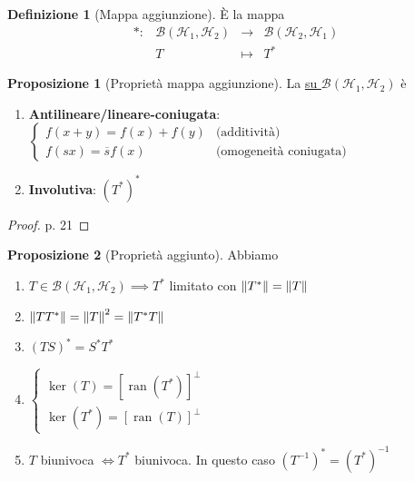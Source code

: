 \documentclass[a4paper,10pt]{article}
\theoremstyle{definition}
\DeclareMathOperator*{\ran}{ran}
\newcommand{\hil}{\mathcal{H}} %
\theoremstyle{indentdefinition}
\newtheorem{defn}{Definizione}[section]
\theoremstyle{indenttheorem}
\newtheorem{prop}{Proposizione}
\theoremstyle{myremark}
\theoremstyle{indentgeneral}
\newenvironment{myboxed} 
{\noindent\begin{lrbox}{\mybox}\begin{minipage}{\textwidth}}
{\end{minipage}\end{lrbox}\fbox{\usebox{\mybox}}}
\begin{document}
\begin{defn}[Mappa aggiunzione]\label{defn-mappa-aggiunzione} È la mappa
$$\begin{array}{cccc}
   *: & \mathcal{B}(\mathcal{H}_1,\mathcal{H}_2) & \to  & \mathcal{B}(\mathcal{H}_2,\mathcal{H}_1) \\
    & T &\mapsto & T^* 
\end{array}$$
\end{defn}

\begin{prop}[Proprietà mappa aggiunzione]\label{thm-prop-mappa-aggiunzione} La  \underline{su $\mathcal{B}(\hil_1,\hil_2)$} è
\begin{enumerate}
    \item \textbf{Antilineare/lineare-coniugata}: $\begin{cases}
        f(x+y)=f(x)+f(y) & \text{(additività)} \\
        f(sx)=\overline{s}f(x) & \text{(omogeneità coniugata)}
    \end{cases}$
    \item \textbf{Involutiva}: $(T^*)^*$
\end{enumerate}
\end{prop}
\begin{proof}
    p. 21
\end{proof}

\begin{myboxed}
\begin{prop}[Proprietà aggiunto]\label{thm-prop-aggiunto}
    Abbiamo
    \begin{enumerate}
        \item $T\in\mathcal{B}(\mathcal{H}_1,\mathcal{H}_2)\implies T^*$ limitato con $\norm{T^*}=\norm{T}$
        \item $\norm{TT^*}=\norm{T}^2=\norm{T^*T}$
        \item $(TS)^*=S^*T^*$
        \item $\begin{cases}
            \ker(T)=[\ran(T^*)]^\perp\\
            \ker(T^*)=[\ran(T)]^\perp
        \end{cases}$
        \item $T$ biunivoca $\iff T^*$ biunivoca. In questo caso $(T^{-1})^*=(T^*)^{-1}$
    \end{enumerate}
\end{prop}
\end{myboxed}
\end{document}
